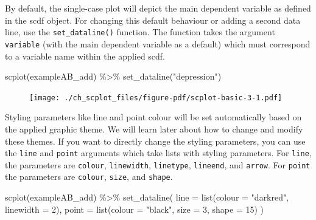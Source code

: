 \documentclass[
  letterpaper,
  DIV=11,
  numbers=noendperiod]{scrreprt}
\newenvironment{Shaded}{\begin{snugshade}}{\end{snugshade}}
\newcommand{\AttributeTok}[1]{\textcolor[rgb]{0.40,0.45,0.13}{#1}}
\newcommand{\DecValTok}[1]{\textcolor[rgb]{0.68,0.00,0.00}{#1}}
\newcommand{\FunctionTok}[1]{\textcolor[rgb]{0.28,0.35,0.67}{#1}}
\newcommand{\NormalTok}[1]{\textcolor[rgb]{0.00,0.23,0.31}{#1}}
\newcommand{\SpecialCharTok}[1]{\textcolor[rgb]{0.37,0.37,0.37}{#1}}
\newcommand{\StringTok}[1]{\textcolor[rgb]{0.13,0.47,0.30}{#1}}
\begin{document}
By default, the single-case plot will depict the main dependent variable
as defined in the scdf object. For changing this default behaviour or
adding a second data line, use the \texttt{set\_dataline()} function.
The function takes the argument \texttt{variable} (with the main
dependent variable as a default) which must correspond to a variable
name within the applied scdf.

\begin{Shaded}
\begin{Highlighting}[]
\FunctionTok{scplot}\NormalTok{(exampleAB\_add) }\SpecialCharTok{\%\textgreater{}\%}
  \FunctionTok{set\_dataline}\NormalTok{(}\StringTok{"depression"}\NormalTok{)}
\end{Highlighting}
\end{Shaded}

\begin{figure}[H]

{\centering \texttt{[image: ./ch\_scplot\_files/figure-pdf/scplot-basic-3-1.pdf]}

}

\end{figure}

Styling parameters like line and point colour will be set automatically
based on the applied graphic theme. We will learn later about how to
change and modify these themes. If you want to directly change the
styling parameters, you can use the \texttt{line} and \texttt{point}
arguments which take lists with styling parameters. For \texttt{line},
the parameters are \texttt{colour}, \texttt{linewidth},
\texttt{linetype}, \texttt{lineend}, and \texttt{arrow}. For
\texttt{point} the parameters are \texttt{colour}, \texttt{size}, and
\texttt{shape}.

\begin{Shaded}
\begin{Highlighting}[]
\FunctionTok{scplot}\NormalTok{(exampleAB\_add) }\SpecialCharTok{\%\textgreater{}\%}
  \FunctionTok{set\_dataline}\NormalTok{(}
    \AttributeTok{line =} \FunctionTok{list}\NormalTok{(}\AttributeTok{colour =} \StringTok{"darkred"}\NormalTok{, }\AttributeTok{linewidth =} \DecValTok{2}\NormalTok{), }
    \AttributeTok{point =} \FunctionTok{list}\NormalTok{(}\AttributeTok{colour =} \StringTok{"black"}\NormalTok{, }\AttributeTok{size =} \DecValTok{3}\NormalTok{, }\AttributeTok{shape =} \DecValTok{15}\NormalTok{)}
\NormalTok{  )}
\end{Highlighting}
\end{Shaded}
\end{document}
